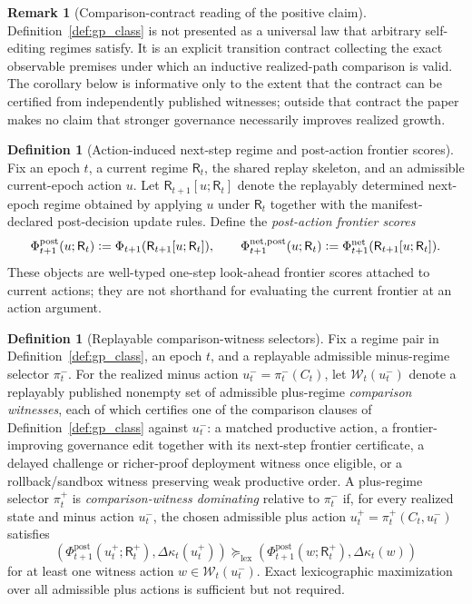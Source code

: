\documentclass[11pt]{article}
\theoremstyle{definition}
\newtheorem{definition}[theorem]{Definition}
\newtheorem{remark}[theorem]{Remark}
\newcommand{\1}{\mathbf{1}}
\newcommand{\Defeq}{\vcentcolon=}
\begin{document}
\begin{remark}[Comparison-contract reading of the positive claim]
Definition~\ref{def:gp_class} is not presented as a universal law that arbitrary self-editing regimes satisfy. It is an explicit transition contract collecting the exact observable premises under which an inductive realized-path comparison is valid. The corollary below is informative only to the extent that the contract can be certified from independently published witnesses; outside that contract the paper makes no claim that stronger governance necessarily improves realized growth.
\end{remark}

\begin{definition}[Action-induced next-step regime and post-action frontier scores]\label{def:post_action_frontier}
Fix an epoch $t$, a current regime $\mathsf R_t$, the shared replay skeleton, and an admissible current-epoch action $u$. Let $\mathsf R_{t+1}[u;\mathsf R_t]$ denote the replayably determined next-epoch regime obtained by applying $u$ under $\mathsf R_t$ together with the manifest-declared post-decision update rules. Define the \emph{post-action frontier scores}
\[
\Phi_{t+1}^{\mathrm{post}}(u;\mathsf R_t)\Defeq \Phi_{t+1}(\mathsf R_{t+1}[u;\mathsf R_t]),
\qquad
\Phi_{t+1}^{\mathrm{net,post}}(u;\mathsf R_t)\Defeq \Phi_{t+1}^{\mathrm{net}}(\mathsf R_{t+1}[u;\mathsf R_t]).
\]
These objects are well-typed one-step look-ahead frontier scores attached to current actions; they are not shorthand for evaluating the current frontier at an action argument.
\end{definition}

\begin{definition}[Replayable comparison-witness selectors]\label{def:witness_selector}
Fix a regime pair in Definition~\ref{def:gp_class}, an epoch $t$, and a replayable admissible minus-regime selector $\pi_t^-$. For the realized minus action $u_t^-=\pi_t^-(C_t)$, let $\mathcal W_t(u_t^-)$ denote a replayably published nonempty set of admissible plus-regime \emph{comparison witnesses}, each of which certifies one of the comparison clauses of Definition~\ref{def:gp_class} against $u_t^-$: a matched productive action, a frontier-improving governance edit together with its next-step frontier certificate, a delayed challenge or richer-proof deployment witness once eligible, or a rollback/sandbox witness preserving weak productive order. A plus-regime selector $\pi_t^+$ is \emph{comparison-witness dominating} relative to $\pi_t^-$ if, for every realized state and minus action $u_t^-$, the chosen admissible plus action $u_t^+=\pi_t^+(C_t,u_t^-)$ satisfies
\[
(\Phi_{t+1}^{\mathrm{post}}(u_t^+;\mathsf R_t^+),\Delta\kappa_t(u_t^+))\succcurlyeq_{\mathrm{lex}}
(\Phi_{t+1}^{\mathrm{post}}(w;\mathsf R_t^+),\Delta\kappa_t(w))
\]
for at least one witness action $w\in\mathcal W_t(u_t^-)$. Exact lexicographic maximization over all admissible plus actions is sufficient but not required.
\end{definition}
\end{document}
